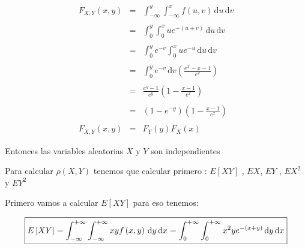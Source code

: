 \documentclass[12pt]{article}
\begin{document}
    \begin{equation*}
        \begin{array}{rcl}
            \displaystyle F_{X,Y} \left(x,y\right) & = & \displaystyle \int_{- \infty}^{y} \int_{-\infty}^{x} f \left(u,v \right) \,\mathrm{d}u  \,\mathrm{d}v
            \\
            \\
            & = & \displaystyle \int_{0}^{y}  \int_{0}^{x} u e^{-\left(u+v\right)} \,\mathrm{d}u \,\mathrm{d}v 
            \\
            \\
            & = & \displaystyle \int_{0}^{y} e^{-v} \int_{0}^{x} u e^{-u} \,\mathrm{d}u \,\mathrm{d}v
            \\
            \\
            &= & \displaystyle \int_{0}^{y} e^{-v} \,\mathrm{d}v \left(\frac{e^x - x -1 }{e^x}\right)  
            \\
            \\
            & = &\displaystyle \frac{e^y -1 }{e^y} \left(1 - \frac{x-1}{e^x}\right)
            \\
            \\
            & = & \displaystyle \left(1 - e^{-y}\right) \left(1- \frac{x-1}{e^x}\right)
            \\
            \\
            \displaystyle F_{X,Y} \left(x,y\right)& = & \displaystyle  F_Y\left(y\right) F_X\left(x\right)
        \end{array}
    \end{equation*}

    \begin{flushleft}
        Entonces las variables aleatorias $X$ y $Y$ son independientes   
    \end{flushleft}

    \vspace{1cm}


    \begin{flushleft}
        Para calcular $\rho \left(X,Y\right)$  tenemos que calcular primero : $E\left[XY\right]$ , $EX$, $EY$ , $EX^2$ y $EY^2$   
    \end{flushleft}
    

    \begin{flushleft}
        Primero vamos a calcular $E\left[XY\right]$ para eso tenemos: 
    \end{flushleft}

    \begin{equation*}
        \fbox{$
        E\left[XY\right] = \displaystyle \int_{- \infty}^{+ \infty} \int_{-\infty}^{+\infty} xy f\left(x,y\right) \,\mathrm{d}y  \,\mathrm{d}x  = \int_{0}^{+\infty} \int_{0}^{+\infty} x^2ye^{-\left(x+y\right)} \,\mathrm{d}y  \,\mathrm{d}x 
        $}
    \end{equation*}
\end{document}

